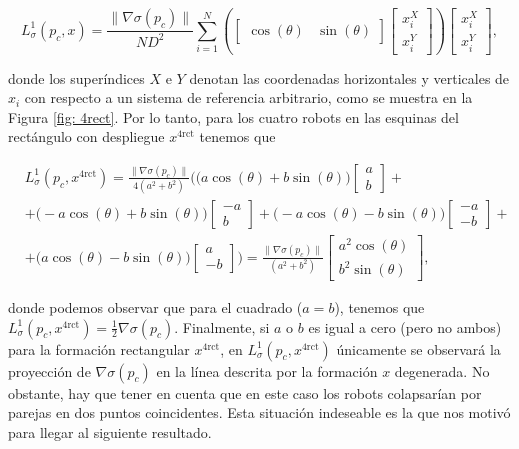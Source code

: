 \begin{equation} \label{eq: L1theta}
L^1_\sigma(p_c, x) = \frac{\|\nabla\sigma(p_c)\|}{ND^2} \sum_{i=1}^N \left(\begin{bmatrix}\cos(\theta) & \sin(\theta) \end{bmatrix} \begin{bmatrix}x_i^X \\ x_i^Y \end{bmatrix}\right)\begin{bmatrix}x_i^X \\ x_i^Y \end{bmatrix},
\end{equation}

donde los superíndices $X$ e $Y$ denotan las coordenadas horizontales y verticales de $x_i$ con respecto a un sistema de referencia arbitrario, como se muestra en la Figura \ref{fig: 4rect}. Por lo tanto, para los cuatro robots en las esquinas del rectángulo con despliegue $x^{4\text{rct}}$ tenemos que

\begin{align}
&L^1_\sigma(p_c, x^{4\text{rct}}) = \frac{\|\nabla\sigma(p_c)\|}{4(a^2+b^2)}\bigg(\big(a\cos(\theta)+b\sin(\theta)\big)\begin{bmatrix}a\\b \end{bmatrix} + \nonumber \\ 
&+\big(-a\cos(\theta)+b\sin(\theta)\big)\begin{bmatrix}-a\\b \end{bmatrix}
+ \big(-a\cos(\theta)-b\sin(\theta)\big)\begin{bmatrix}-a\\-b \end{bmatrix} + \nonumber \\
&+ \big(a\cos(\theta)-b\sin(\theta)\big)\begin{bmatrix}a\\-b \end{bmatrix} \bigg) = \frac{\|\nabla\sigma(p_c)\|}{(a^2 + b^2)}\begin{bmatrix}a^2\cos(\theta)\\b^2 \sin(\theta)\end{bmatrix}, \nonumber %
\end{align}

donde podemos observar que para el cuadrado ($a=b$), tenemos que $L^1_\sigma(p_c, x^{4\text{rct}}) = \frac{1}{2}\nabla\sigma(p_c)$. Finalmente, si $a$ o $b$ es igual a cero (pero no ambos) para la formación rectangular $x^{4\text{rct}}$, en $L^1_\sigma(p_c, x^{4\text{rct}})$ únicamente se observará la proyección de $\nabla\sigma(p_c)$ en la línea descrita por la formación $x$ degenerada. No obstante, hay que tener en cuenta que en este caso los robots colapsarían por parejas en dos puntos coincidentes. Esta situación indeseable es la que nos motivó para llegar al siguiente resultado.

